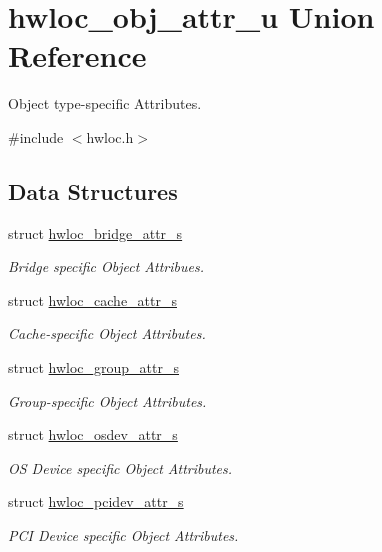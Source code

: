 \hypertarget{a00017}{
\section{hwloc\_\-obj\_\-attr\_\-u Union Reference}
\label{a00017}
}


Object type-\/specific Attributes.  




{\ttfamily \#include $<$hwloc.h$>$}

\subsection*{Data Structures}
\begin{DoxyCompactItemize}
\item 
struct \hyperlink{a00012}{hwloc\_\-bridge\_\-attr\_\-s}
\begin{DoxyCompactList}\small\item\em Bridge specific Object Attribues. \item\end{DoxyCompactList}\item 
struct \hyperlink{a00013}{hwloc\_\-cache\_\-attr\_\-s}
\begin{DoxyCompactList}\small\item\em Cache-\/specific Object Attributes. \item\end{DoxyCompactList}\item 
struct \hyperlink{a00015}{hwloc\_\-group\_\-attr\_\-s}
\begin{DoxyCompactList}\small\item\em Group-\/specific Object Attributes. \item\end{DoxyCompactList}\item 
struct \hyperlink{a00021}{hwloc\_\-osdev\_\-attr\_\-s}
\begin{DoxyCompactList}\small\item\em OS Device specific Object Attributes. \item\end{DoxyCompactList}\item 
struct \hyperlink{a00022}{hwloc\_\-pcidev\_\-attr\_\-s}
\begin{DoxyCompactList}\small\item\em PCI Device specific Object Attributes. \item\end{DoxyCompactList}\end{DoxyCompactItemize}
